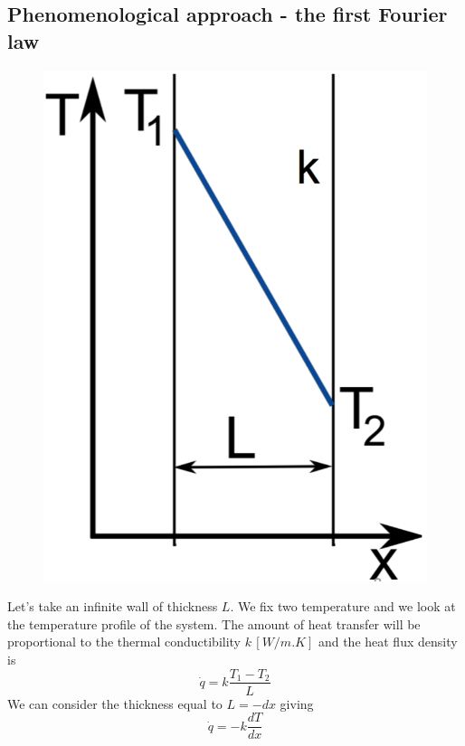  		\subsection{Phenomenological approach - the first Fourier law}
 			\begin{figure}
 			\vspace{-5mm}
 			\includegraphics[scale=0.2]{ch3/4}
 			\end{figure}
 			Let's take an infinite wall of thickness $L$. We fix two temperature and we look at the temperature profile of the system. The amount of heat transfer will be proportional to the thermal conductibility $k \, [W/m.K]$  and the heat flux density is 
 			\begin{equation}
 				\dot{q} = k \frac{T_1-T_2}{L}
 			\end{equation}
 			We can consider the thickness equal to $L = -dx$ giving
 			\begin{equation}
 				\dot{q} = -k\frac{dT}{dx}
 			\end{equation}
 			
